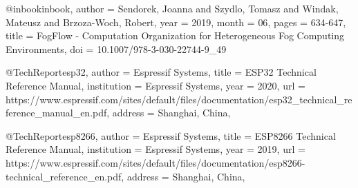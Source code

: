 

@inbook{inbook,
    author = {Sendorek, Joanna and Szydlo, Tomasz and Windak, Mateusz and Brzoza-Woch, Robert},
    year = {2019},
    month = {06},
    pages = {634-647},
    title = {FogFlow - Computation Organization for Heterogeneous Fog Computing Environments},
    doi = {10.1007/978-3-030-22744-9_49}
}




@TechReport{esp32,
    author      = {{Espressif Systems}},
    title       = {ESP32 Technical Reference Manual},
    institution = {{Espressif Systems}},
    year        = {2020},
    url = {https://www.espressif.com/sites/default/files/documentation/esp32_technical_reference_manual_en.pdf},
    address     = {Shanghai, China},
}

@TechReport{esp8266,
  author      = {{Espressif Systems}},
  title       = {ESP8266 Technical Reference Manual},
  institution = {{Espressif Systems}},
  year        = {2019},
  url = {https://www.espressif.com/sites/default/files/documentation/esp8266-technical_reference_en.pdf},
  address     = {Shanghai, China},
}